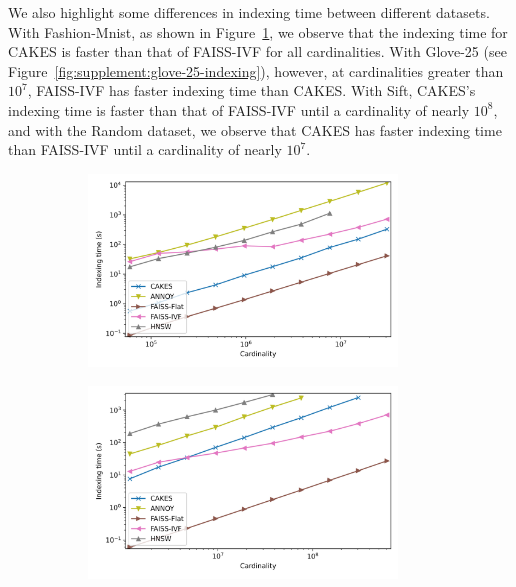 \documentclass[review,supplement,onefignum,onetabnum]{siamonline220329}
\begin{document}
We also highlight some differences in indexing time between different datasets.
With Fashion-Mnist, as shown in Figure~\ref{fig:supplement:fashion-mnist-indexing}, we observe that the indexing time for CAKES is faster than that of FAISS-IVF for all cardinalities.
With Glove-25 (see Figure~\ref{fig:supplement:glove-25-indexing}), however, at cardinalities greater than $10^7$, FAISS-IVF has faster indexing time than CAKES.
With Sift, CAKES's indexing time is faster than that of FAISS-IVF until a cardinality of nearly $10^8$, and with the Random dataset, we observe that CAKES has faster indexing time than FAISS-IVF until a cardinality of nearly $10^7$.

\begin{figure}
    \captionsetup[subfigure]{aboveskip=-15pt,belowskip=-3pt}
    \begin{subfigure}[b]{0.47\textwidth}
        \includegraphics[width=0.9\textwidth]{images/indexing/fashion-mnist-indexing.png}\\
        \label{fig:supplement:fashion-mnist-indexing}
    \end{subfigure}%
    \begin{subfigure}[b]{0.47\textwidth}
        \includegraphics[width=0.9\textwidth]{images/indexing/glove-25-indexing.png}\\

\end{subfigure}
\end{figure}
\end{document}
